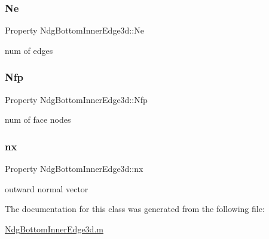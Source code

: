 \subsubsection{\texorpdfstring{Ne}{Ne}}
{\footnotesize\ttfamily Property Ndg\+Bottom\+Inner\+Edge3d\+::\+Ne\hspace{0.3cm}{\ttfamily [protected]}}



num of edges 

\mbox{\label{class_ndg_bottom_inner_edge3d_a2bfe5e170ef954a0879b3e2583ac333a}} 
\subsubsection{\texorpdfstring{Nfp}{Nfp}}
{\footnotesize\ttfamily Property Ndg\+Bottom\+Inner\+Edge3d\+::\+Nfp\hspace{0.3cm}{\ttfamily [protected]}}



num of face nodes 

\mbox{\label{class_ndg_bottom_inner_edge3d_a9edd59903f00eb990c493931a9714bdd}} 
\subsubsection{\texorpdfstring{nx}{nx}}
{\footnotesize\ttfamily Property Ndg\+Bottom\+Inner\+Edge3d\+::nx\hspace{0.3cm}{\ttfamily [protected]}}



outward normal vector 



The documentation for this class was generated from the following file\+:\begin{DoxyCompactItemize}
\item 
\hyperlink{_ndg_bottom_inner_edge3d_8m}{Ndg\+Bottom\+Inner\+Edge3d.\+m}\end{DoxyCompactItemize}
